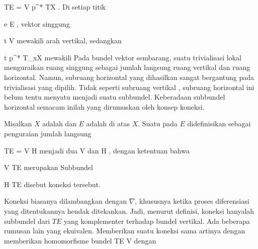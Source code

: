 \mavergleichskette
{\vergleichskette
{ TE
}
{ = }{ V \oplus p^* TX
}
{  }{
}
{    }{
}
{   }{
}
}
{}{}{.}
Di setiap titik

\mavergleichskette
{\vergleichskette
{ e
}
{ \in }{ E
}
{  }{
}
{    }{
}
{   }{
}
}
{}{}{,}
vektor singgung

\mavergleichskette
{\vergleichskette
{ t
}
{ \in }{ V
}
{  }{
}
{    }{
}
{   }{
}
}
{}{}{}
mewakili arah vertikal, sedangkan

\mavergleichskette
{\vergleichskette
{ t
}
{ \in }{ p^* T_xX
}
{  }{
}
{    }{
}
{   }{
}
}
{}{}{}
mewakili 
Pada bundel vektor sembarang, suatu trivialisasi lokal menguraikan ruang singgung
 sebagai jumlah langsung ruang vertikal dan ruang horizontal. Namun, subruang horizontal yang dihasilkan sangat bergantung pada trivialisasi yang dipilih. Tidak seperti subruang vertikal
 {} {,}
subruang horizontal ini belum tentu menyatu menjadi suatu subbundel. Keberadaan subbundel horizontal semacam inilah yang dirumuskan oleh konsep koneksi.

{}
{

Misalkan $X$ adalah
dan $E$ adalah
di atas $X$. Suatu
pada $E$ didefinisikan sebagai penguraian jumlah langsung

\mavergleichskette
{\vergleichskette
{ TE
}
{ = }{ V \oplus H
}
{  }{
}
{    }{
}
{   }{
}
}
{}{}{}
menjadi dua
\mathkor {} {V} {dan} {H} {,}
dengan ketentuan bahwa

\mavergleichskette
{\vergleichskette
{ V
}
{ \subseteq }{ TE
}
{  }{
}
{    }{
}
{   }{
}
}
{}{}{}
merupakan
Subbundel

\mavergleichskette
{\vergleichskette
{ H
}
{ \subseteq }{ TE
}
{  }{
}
{    }{
}
{   }{
}
}
{}{}{}
disebut
koneksi tersebut.

}

Koneksi biasanya dilambangkan dengan $\nabla$, khususnya ketika proses diferensiasi yang ditentukannya hendak ditekankan. Jadi, menurut definisi, koneksi hanyalah subbundel dari $TE$ yang komplementer terhadap bundel vertikal. Ada beberapa rumusan lain yang ekuivalen. Memberikan suatu koneksi sama artinya dengan memberikan homomorfisme bundel
 {} {}
 {TE} {V
} {}
dengan

